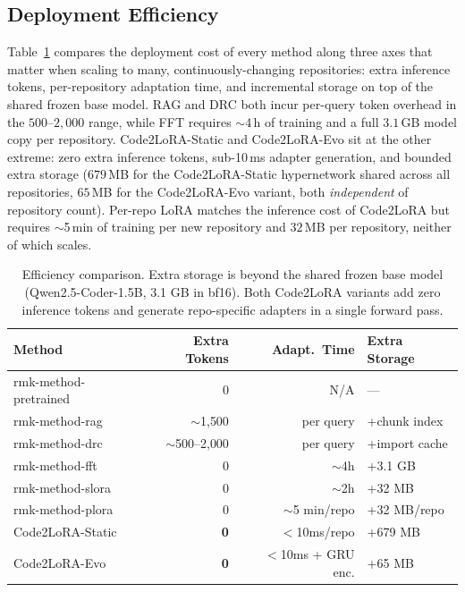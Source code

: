 \documentclass{llmxive}
\providecommand{\UseMacro}[1]{\csname rmk-#1\endcsname}
\providecommand{\codelora}{Code2LoRA\xspace}
\providecommand{\codelorastatic}{\codelora-Static\xspace}
\providecommand{\codeloraevo}{\codelora-Evo\xspace}
\begin{document}
\subsection{Deployment Efficiency}
\label{app:efficiency}

Table~\ref{tab:efficiency} compares the deployment cost of every method along three axes that matter when scaling to many, continuously-changing repositories: extra inference tokens, per-repository adaptation time, and incremental storage on top of the shared frozen base model.
RAG and DRC both incur per-query token overhead in the $500$--$2{,}000$ range, while FFT requires $\sim$4\,h of training and a full $3.1$\,GB model copy per repository.
\codelorastatic{} and \codeloraevo{} sit at the other extreme: zero extra inference tokens, sub-10\,ms adapter generation, and bounded extra storage ($679$\,MB for the \codelorastatic{} hypernetwork shared across all repositories, $65$\,MB for the \codeloraevo{} variant, both \emph{independent} of repository count).
Per-repo LoRA matches the inference cost of \codelora{} but requires $\sim$5\,min of training per new repository and $32$\,MB per repository, neither of which scales.

\begin{table}[t]
\begin{small}
\begin{center}
\begin{tabular}{lrrl}
\toprule
Method & Extra Tokens & Adapt.\ Time & Extra Storage \\
\midrule
\UseMacro{method-pretrained} & 0 & N/A & --- \\
\UseMacro{method-rag} & $\sim$1{,}500 & per query & +chunk index \\
\UseMacro{method-drc} & $\sim$500--2{,}000 & per query & +import cache \\
\UseMacro{method-fft} & 0 & $\sim$4h & +3.1 GB \\
\UseMacro{method-slora} & 0 & $\sim$2h & +32 MB \\
\UseMacro{method-plora} & 0 & $\sim$5 min/repo & +32 MB/repo \\
\codelorastatic{} & \textbf{0} & $<$10ms/repo & +679 MB \\
\codeloraevo{} & \textbf{0} & $<$10ms + GRU enc. & +65 MB \\
\bottomrule
\end{tabular}


\end{center}
\end{small}
\caption{Efficiency comparison. Extra storage is beyond the shared frozen base model (Qwen2.5-Coder-1.5B, 3.1 GB in bf16). Both \codelora{} variants add zero inference tokens and generate repo-specific adapters in a single forward pass.}
\label{tab:efficiency}
\end{table}
\end{document}
